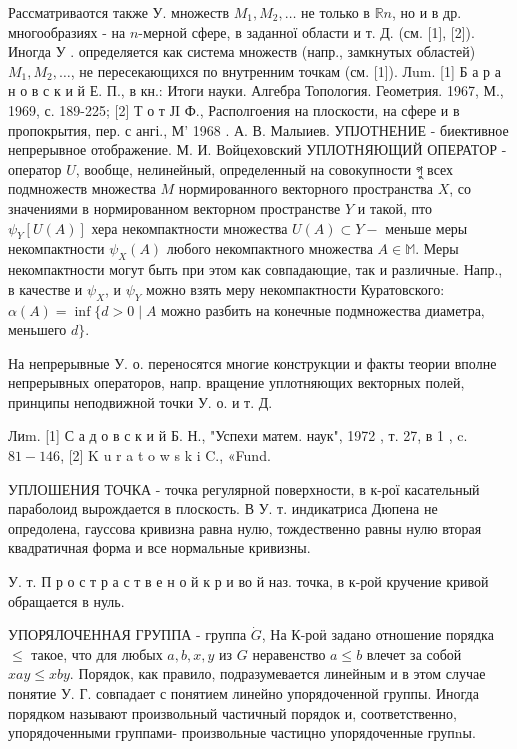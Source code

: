 \documentclass[10pt]{article}
\begin{document}
Рассматриваотся также У. множеств $M_{1}, M_{2}, \ldots$ не только в $\mathbb{R} n$, но и в др. многообразиях - на $n$-мерной сфере, в заданної области и т. Д. (см. [1], [2]). Иногда У . определяется как система множеств (напр., замкнутых областей) $M_{1}, M_{2}, \ldots$, не пересекающихся по внутренним точкам (см. [1]). Лum. [1] Б а р а н о в с к и й Е. П., в кн.: Итоги науки. Алгебра Топология. Геометрия. 1967, М., 1969, с. 189-225; [2] Т о т ЈI Ф., Располгоения на плоскости, на сфере и в пропокрытия, пер. с ангі., М' 1968 . А. В. Малыиев. УПЈОТНЕНИЕ - биективное непрерывное отображение. М. И. Войцеховский УПЛОТНЯЮЩИЙ ОПЕРАТОР - оператор $U$, вообще, нелинейный, определенный на совокупности গু всех подмножеств множества $M$ нормированного векторного пространства $X$, со значениями в нормированном векторном пространстве $Y$ и такой, пто $\psi_{Y}[U(A)]$ хера некомпактности множества $U(A) \subset Y-$ меньше меры некомпактности $\psi_{X}(A)$ любого некомпактного множества $A \in \mathbb{M}$. Меры некомпактности могут быть при этом как совпадающие, так и различные. Напр., в качестве и $\psi_{X}$, и $\psi_{Y}$ можно взять меру некомпактности Куратовского: $\alpha(A)=\inf \{d>0 \mid A$ можно разбить на конечные подмножества диаметра, меньшего $d\}$.



На непрерывные У. о. переносятся многие конструкции и факты теории вполне непрерывных операторов, напр. вращение уплотняющих векторных полей, принципы неподвижной точки У. о. и т. Д.



Лиm. [1] С а д о в с к и й Б. Н., "Успехи матем. наук", 1972 , т. 27, в 1 , c. $81-146$, [2] K u r a t o w s k i C., «Fund.



УПЛОШЕНИЯ ТОЧКА - точка регулярной поверхности, в к-рої касательный параболоид вырождается в плоскость. В У. т. индикатриса Дюпена не опредолена, гауссова кривизна равна нулю, тождественно равны нулю вторая квадратичная форма и все нормальные кривизны.



У. т. П р о с т р а с т в е н о й к р и во й наз. точка, в к-рой кручение кривой обращается в нуль.



УПОРЯЛОЧЕННАЯ ГРУППА - группа $\dot{G}$, На К-роӥ задано отношение порядка $\leqslant$ такое, что для любых $a, b, x, y$ из $G$ неравенство $a \leqslant b$ влечет за собой $x a y \leqslant x b y$. Порядок, как правило, подразумевается линейным и в этом случае понятие У. Г. совпадает с понятием линейно упорядоченной группы. Иногда порядком называют произвольный частичный порядок и, соответственно, упорядоченными группами- произвольные частицно упорядоченные групnы.
\end{document}

